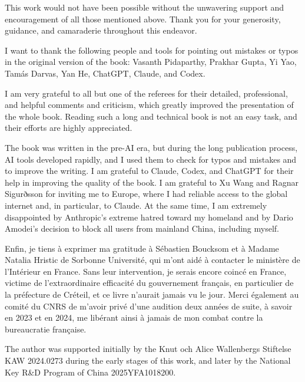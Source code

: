 This work would not have been possible without the unwavering support and encouragement of all those mentioned above. Thank you for your generosity, guidance, and camaraderie throughout this endeavor.

I want to thank the following people and tools for pointing out mistakes or typos in the original version of the book: Vasanth Pidaparthy, Prakhar Gupta, Yi Yao, Tamás Darvas, Yan He, ChatGPT, Claude, and Codex.

I am very grateful to all but one of the referees for their detailed, professional, and helpful comments and criticism, which greatly improved the presentation of the whole book. Reading such a long and technical book is not an easy task, and their efforts are highly appreciated.

The book was written in the pre-AI era, but during the long publication process, AI tools developed rapidly, and I used them to check for typos and mistakes and to improve the writing. I am grateful to Claude, Codex, and ChatGPT for their help in improving the quality of the book. I am grateful to Xu Wang and Ragnar Sigurðsson for inviting me to Europe, where I had reliable access to the global internet and, in particular, to Claude.
At the same time, I am extremely disappointed by Anthropic's extreme hatred toward my homeland and by Dario Amodei's decision to block all users from mainland China, including myself.

Enfin, je tiens à exprimer ma gratitude à Sébastien Boucksom et à Madame Natalia Hristic de Sorbonne Université, qui m'ont aidé à contacter le ministère de l'Intérieur en France. Sans leur intervention, je serais encore coincé en France, victime de l'extraordinaire efficacité du gouvernement français, en particulier de la préfecture de Créteil, et ce livre n'aurait jamais vu le jour. Merci également au comité du CNRS de m'avoir privé d'une audition deux années de suite, à savoir en 2023 et en 2024, me libérant ainsi à jamais de mon combat contre la bureaucratie française.


The author was supported initially by the Knut och Alice Wallenbergs Stiftelse KAW 2024.0273 during the early stages of this work, and later by the National Key R\&D Program of China 2025YFA1018200.
